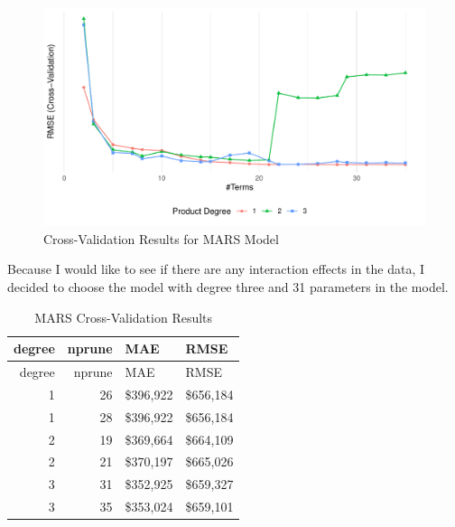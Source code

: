 \documentclass[
]{article}
\begin{document}
\begin{figure}
\centering
\includegraphics{final_report_files/figure-latex/unnamed-chunk-13-1.pdf}
\caption{Cross-Validation Results for MARS Model}
\end{figure}

Because I would like to see if there are any interaction effects in the
data, I decided to choose the model with degree three and 31 parameters
in the model.

\begin{longtable}[]{@{}rrll@{}}
\caption{MARS Cross-Validation Results}\tabularnewline
\toprule()
degree & nprune & MAE & RMSE \\
\midrule()
\endfirsthead
\toprule()
degree & nprune & MAE & RMSE \\
\midrule()
\endhead
1 & 26 & \$396,922 & \$656,184 \\
1 & 28 & \$396,922 & \$656,184 \\
2 & 19 & \$369,664 & \$664,109 \\
2 & 21 & \$370,197 & \$665,026 \\
3 & 31 & \$352,925 & \$659,327 \\
3 & 35 & \$353,024 & \$659,101 \\
\bottomrule()
\end{longtable}
\end{document}
